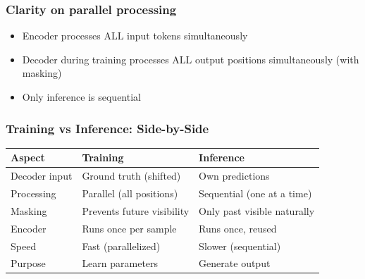 

\begin{frame}[fragile]\frametitle{Clarity on parallel processing}

\begin{itemize}
\item Encoder processes ALL input tokens simultaneously
\item Decoder during training processes ALL output positions simultaneously (with masking)
\item Only inference is sequential
\end{itemize}

\end{frame}

\begin{frame}[fragile]\frametitle{Training vs Inference: Side-by-Side}

\begin{center}
\begin{tabular}{|p{4cm}|p{4cm}|p{4cm}|}
\hline
\textbf{Aspect} & \textbf{Training} & \textbf{Inference} \\
\hline
Decoder input & Ground truth (shifted) & Own predictions \\
\hline
Processing & Parallel (all positions) & Sequential (one at a time) \\
\hline
Masking & Prevents future visibility & Only past visible naturally \\
\hline
Encoder & Runs once per sample & Runs once, reused \\
\hline
Speed & Fast (parallelized) & Slower (sequential) \\
\hline
Purpose & Learn parameters & Generate output \\
\hline
\end{tabular}
\end{center}
\end{frame}